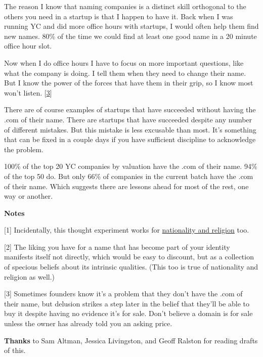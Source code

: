 The reason I know that naming companies is a distinct skill orthogonal
to the others you need in a startup is that I happen to have it.
Back when I was running YC and did more office hours with startups,
I would often help them find new names.  80\% of the time we could
find at least one good name in a 20 minute office hour slot.

Now when I do office hours I have to focus on more important
questions, like what the company is doing.  I tell them when they
need to change their name.  But I know the power of the forces that
have them in their grip, so I know most won't listen. 
[\href{\#f1n}{3}]

There are of course examples of startups that have succeeded without
having the .com of their name.  There are startups that have succeeded despite any
number of different mistakes.  But this mistake is less excusable
than most.  It's something that can be fixed in a couple days if
you have sufficient discipline to acknowledge the problem.

100\% of the top 20 YC companies by valuation have the .com of their
name. 94\% of the top 50 do. But only 66\% of companies in the current
batch have the .com of their name. Which suggests there are lessons
ahead for most of the rest, one way or another.






\textbf{Notes}

[1]
Incidentally, this thought experiment works for
\href{http://www.paulgraham.com/identity.html}{nationality and religion} too.

[2]
The liking you have for a name that has become part of your
identity manifests itself not directly, which would be easy to
discount, but as a collection of specious beliefs about its intrinsic
qualities.  (This too is true of nationality and religion as well.)

[3]
Sometimes founders know it's a problem that they don't have
the .com of their name, but delusion strikes a step later in the belief that they'll
be able to buy it despite having no evidence it's for sale.  Don't
believe a domain is for sale unless the owner has already told you
an asking price.


\textbf{Thanks} to Sam Altman, Jessica Livingston, and Geoff Ralston
for reading drafts of this.




